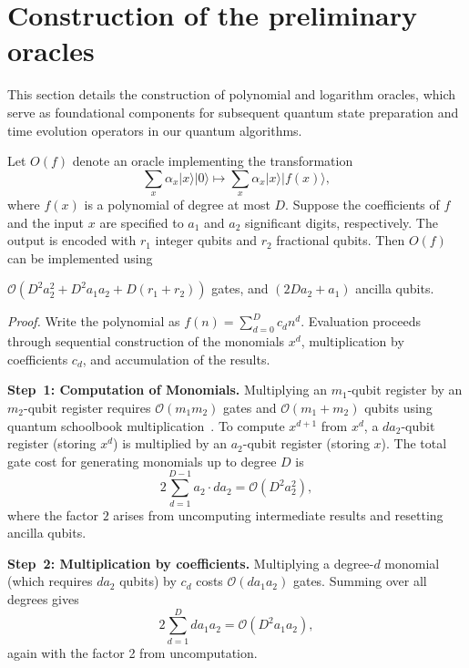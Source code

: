 \documentclass[aps,pra,twocolumn,superscriptaddress,preprintnumbers,amsmath,amssymb]{revtex4-2}
\begin{document}
\section{Construction of the preliminary  oracles}
This section details the construction of polynomial and logarithm oracles, which serve as foundational components for subsequent quantum state preparation and time evolution operators in our quantum algorithms.
\begin{lemma}\label{polynomial}
Let $O(f)$ denote an  oracle implementing the transformation 
\begin{equation}
    \sum_x\alpha_x|x\rangle|0\rangle\mapsto \sum_x\alpha_x|x\rangle|f(x)\rangle,
\end{equation}
where $f(x)$ is a polynomial of degree at most $D$. Suppose the coefficients of $f$ and the input $x$ are specified to $a_1$ and $a_2$ significant digits, respectively. The output is encoded with $r_1$ integer qubits and $r_2$ fractional qubits. Then  $O(f)$ can be implemented using
\begin{center}
 $\mathcal{O}\!\left(D^{2}a_2^{2} + D^{2}a_1a_2 + D(r_1+r_2)\right)$ gates, and $(2Da_2+a_1)$ ancilla qubits.   
\end{center}
\end{lemma}
\noindent\textit{Proof.} 
Write the polynomial as $f(n)=\textstyle\sum_{d=0}^{D} c_d n^{d}$. Evaluation proceeds through sequential construction of the monomials $x^{d}$, multiplication by coefficients $c_d$, and accumulation of the results.

\textbf{Step~1: Computation of Monomials.}
Multiplying an $m_1$-qubit register by an $m_2$-qubit register requires $\mathcal{O}(m_1 m_2)$ gates and $\mathcal{O}(m_1 + m_2)$ qubits using quantum schoolbook multiplication~\cite{litinski2024quantum}. To compute \( x^{d+1} \) from \( x^d \), a $d a_2$-qubit register (storing \( x^d \)) is multiplied by an $a_2$-qubit register (storing \( x \)). The total gate cost for generating monomials up to degree \( D \) is
\begin{equation}
2 \sum_{d=1}^{D-1} a_2 \cdot d a_2 = \mathcal{O}(D^{2}a_2^{2}),
\end{equation}
where the factor $2$ arises from uncomputing intermediate results and resetting ancilla qubits. \par
\textbf{Step~2: Multiplication by coefficients.}  
 Multiplying a degree-\( d \) monomial (which requires \( d a_2 \) qubits) by \( c_d \) costs \( \mathcal{O}(d a_1 a_2) \) gates. 
Summing over all degrees gives
\begin{equation}
2 \sum_{d=1}^{D} d a_1a_2 = \mathcal{O}(D^2a_1a_2),
\end{equation}
again with the factor 2 from uncomputation.  
\end{document}
